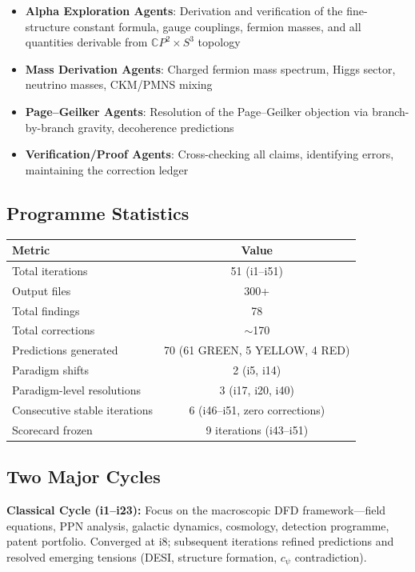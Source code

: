 \documentclass[11pt,a4paper]{article}
\begin{document}
\begin{itemize}[nosep]
\item \textbf{Alpha Exploration Agents}: Derivation and verification of the fine-structure constant formula, gauge couplings, fermion masses, and all quantities derivable from $\mathbb{C}P^2 \times S^3$ topology
\item \textbf{Mass Derivation Agents}: Charged fermion mass spectrum, Higgs sector, neutrino masses, CKM/PMNS mixing
\item \textbf{Page--Geilker Agents}: Resolution of the Page--Geilker objection via branch-by-branch gravity, decoherence predictions
\item \textbf{Verification/Proof Agents}: Cross-checking all claims, identifying errors, maintaining the correction ledger
\end{itemize}

\subsection{Programme Statistics}

\begin{center}
\begin{tabular}{lc}
\toprule
\textbf{Metric} & \textbf{Value} \\
\midrule
Total iterations & 51 (i1--i51) \\
Output files & 300+ \\
Total findings & 78 \\
Total corrections & $\sim$170 \\
Predictions generated & 70 (61 GREEN, 5 YELLOW, 4 RED) \\
Paradigm shifts & 2 (i5, i14) \\
Paradigm-level resolutions & 3 (i17, i20, i40) \\
Consecutive stable iterations & 6 (i46--i51, zero corrections) \\
Scorecard frozen & 9 iterations (i43--i51) \\
\bottomrule
\end{tabular}
\end{center}

\subsection{Two Major Cycles}

\textbf{Classical Cycle (i1--i23):} Focus on the macroscopic DFD framework---field equations, PPN analysis, galactic dynamics, cosmology, detection programme, patent portfolio. Converged at i8; subsequent iterations refined predictions and resolved emerging tensions (DESI, structure formation, $c_\psi$ contradiction).
\end{document}
